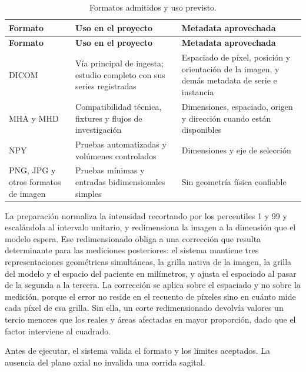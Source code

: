 {\small
\setlength{\LTleft}{0pt}
\setlength{\LTright}{0pt}
\setlength{\tabcolsep}{3pt}
\renewcommand{\arraystretch}{1.18}
\begin{longtable}{>{\raggedright\arraybackslash}p{} >{\raggedright\arraybackslash}p{} >{\raggedright\arraybackslash}p{}}
\caption{Formatos admitidos y uso previsto.}\label{tab:cap-formatos-ingesta}\\
\hline
\textbf{Formato} & \textbf{Uso en el proyecto} & \textbf{Metadata aprovechada} \\
\hline
\endfirsthead
\hline
\textbf{Formato} & \textbf{Uso en el proyecto} & \textbf{Metadata aprovechada} \\
\hline
\endhead
\hline
\endfoot
DICOM & Vía principal de ingesta; estudio completo con sus series registradas & Espaciado de píxel, posición y orientación de la imagen, y demás metadata de serie e instancia \\
MHA y MHD & Compatibilidad técnica, fixtures y flujos de investigación & Dimensiones, espaciado, origen y dirección cuando están disponibles \\
NPY & Pruebas automatizadas y volúmenes controlados & Dimensiones y eje de selección \\
PNG, JPG y otros formatos de imagen & Pruebas mínimas y entradas bidimensionales simples & Sin geometría física confiable \\
\hline
\end{longtable}
}

La preparación normaliza la intensidad recortando por los percentiles 1 y 99 y escalándola al intervalo unitario, y redimensiona la imagen a la dimensión que el modelo espera. Ese redimensionado obliga a una corrección que resulta determinante para las mediciones posteriores: el sistema mantiene tres representaciones geométricas simultáneas, la grilla nativa de la imagen, la grilla del modelo y el espacio del paciente en milímetros, y ajusta el espaciado al pasar de la segunda a la tercera. La corrección se aplica sobre el espaciado y no sobre la medición, porque el error no reside en el recuento de píxeles sino en cuánto mide cada píxel de esa grilla. Sin ella, un corte redimensionado devolvía valores un tercio menores que los reales y áreas afectadas en mayor proporción, dado que el factor interviene al cuadrado.

Antes de ejecutar, el sistema valida el formato y los límites aceptados. La ausencia del plano axial no invalida una corrida sagital.

